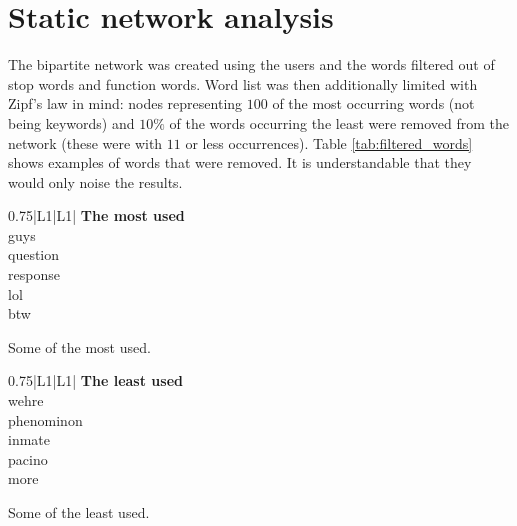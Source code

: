 \section{Static network analysis}

  The bipartite network was created using the users and the words filtered out of stop words and function words. Word list was then additionally limited with Zipf's law in mind: nodes representing $100$ of the most occurring words (not being keywords) and $10\%$ of the words occurring the least were removed from the network (these were with $11$ or less occurrences). Table \ref{tab:filtered_words} shows examples of words that were removed. It is understandable that they would only noise the results.  
  \begin{table}[H]
    \begin{subtable}{0.49\textwidth}
      \centering
      \begin{tabularx}{0.75\textwidth}{|L{1}|L{1}|} \hline
         \textbf{The most used} \\\hline
        guys \\
        question \\
        response \\
        lol \\
        btw \\
        \hline
      \end{tabularx}
      \caption{Some of the most used.}
      \label{tab:filtered_words_top}
    \end{subtable}
    \begin{subtable}{0.49\textwidth}
      \centering
      \begin{tabularx}{0.75\textwidth}{|L{1}|L{1}|} \hline
         \textbf{The least used} \\\hline
        wehre \\
        phenominon \\
        inmate \\
        pacino \\
        more \\
        \hline
      \end{tabularx}
      \caption{Some of the least used.}
      \label{tab:filtered_words_bottom}
    \end{subtable}
    \caption{Selected examples of the most and the least used non-keyword words.}
    \label{tab:filtered_words}
  \end{table}
  
